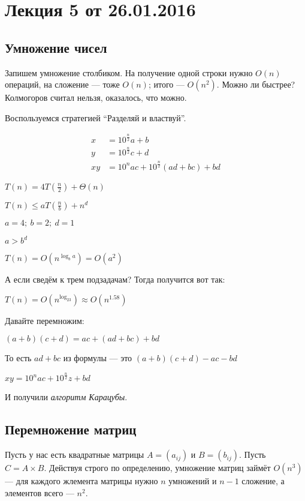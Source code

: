 



\section*{Лекция 5 от 26.01.2016}

\subsection{Умножение чисел}

Запишем умножение столбиком. На получение одной строки нужно $O(n)$ операций, на сложение --- тоже $O(n)$; итого --- $O(n^2)$. Можно ли быстрее? Колмогоров считал нельзя, оказалось, что можно.

Воспользуемся стратегией ``Разделяй и властвуй''. 

\begin{align*}
    x &= 10^{\frac{n}{2}}a + b\\
    y &= 10^{\frac{n}{2}}c + d\\
    \hline
    xy &= 10^nac + 10^{\frac{n}{2}}(ad+bc)+bd
\end{align*}

$T(n) = 4T\left( \frac{n}{2} \right) + \Theta(n)$

$T(n) \leqslant aT\left( \frac{n}{b} \right) + n^d$

$a = 4;\ b = 2;\ d = 1$

$a > b^d$

$T(n) = O\left( n^{\log_ba} \right) = O(a^2)$

А если сведём к трем подзадачам? Тогда получится вот так:

$T(n) = O\left( n^{\log_23} \right) \approx O(n^{1.58})$

Давайте перемножим:

$(a+b)(c+d) = ac+(ad+bc) + bd$

То есть $ad+bc$ из формулы --- это $(a+b)(c+d) - ac - bd$

$xy = 10^nac + 10^{\frac{n}{2}}z+bd$

И получили \emph{алгоритм Карацубы}.

\subsection{Перемножение матриц}

Пусть у нас есть квадратные матрицы $A = (a_{ij})$ и $B = (b_{ij})$. Пусть $C = A\times B$. Действуя строго по определению, умножение матриц займёт $O(n^3)$ --- для каждого жлемента матрицы нужно $n$ умножений и $n-1$ сложение, а элементов всего --- $n^2$.

